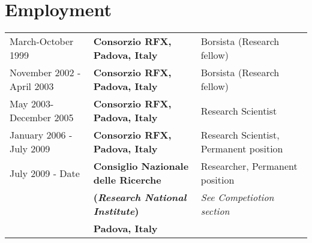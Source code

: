 
\section{Employment}
\begin{tabular}{lll}
March-October 1999 & \textbf{Consorzio RFX, Padova, Italy} & Borsista
(Research fellow) \\
November 2002 - April 2003 & \textbf{Consorzio RFX, Padova, Italy} &
Borsista (Research fellow) \\
May 2003-December 2005 & \textbf{Consorzio RFX, Padova, Italy} &
Research Scientist \\ 
January 2006 - July 2009 & \textbf{Consorzio RFX, Padova, Italy} &
Research Scientist, Permanent position \\
July 2009 - Date & \textbf{Consiglio Nazionale delle Ricerche} &
Researcher, Permanent position \\
& \textbf{(\emph{Research National Institute})} & \emph{See Competiotion section}\\
& \textbf{Padova, Italy} & 
\end{tabular}
